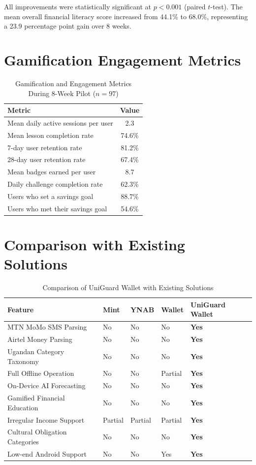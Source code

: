\documentclass[12pt]{report}
\begin{document}
All improvements were statistically significant at $p < 0.001$ (paired $t$-test). The
mean overall financial literacy score increased from 44.1\% to 68.0\%, representing a
23.9 percentage point gain over 8 weeks.

\section{Gamification Engagement Metrics}

\begin{table}[H]
\centering
\caption{Gamification and Engagement Metrics During 8-Week Pilot ($n = 97$)}
\label{tab:engagement}
\begin{tabular}{lc}
\toprule
\textbf{Metric} & \textbf{Value} \\
\midrule
Mean daily active sessions per user & 2.3 \\
Mean lesson completion rate         & 74.6\% \\
7-day user retention rate           & 81.2\% \\
28-day user retention rate          & 67.4\% \\
Mean badges earned per user         & 8.7 \\
Daily challenge completion rate     & 62.3\% \\
Users who set a savings goal        & 88.7\% \\
Users who met their savings goal    & 54.6\% \\
\bottomrule
\end{tabular}
\end{table}

\section{Comparison with Existing Solutions}

\begin{table}[H]
\centering
\caption{Comparison of UniGuard Wallet with Existing Solutions}
\label{tab:comparison}
\begin{tabular}{p{4cm} p{1.5cm} p{1.5cm} p{1.5cm} p{2.5cm}}
\toprule
\textbf{Feature} & \textbf{Mint} & \textbf{YNAB} & \textbf{Wallet} & \textbf{UniGuard Wallet} \\
\midrule
MTN MoMo SMS Parsing & No & No & No & \textbf{Yes} \\
Airtel Money Parsing & No & No & No & \textbf{Yes} \\
Ugandan Category Taxonomy & No & No & No & \textbf{Yes} \\
Full Offline Operation & No & No & Partial & \textbf{Yes} \\
On-Device AI Forecasting & No & No & No & \textbf{Yes} \\
Gamified Financial Education & No & No & No & \textbf{Yes} \\
Irregular Income Support & Partial & Partial & Partial & \textbf{Yes} \\
Cultural Obligation Categories & No & No & No & \textbf{Yes} \\
Low-end Android Support & No & No & Yes & \textbf{Yes} \\
\bottomrule
\end{tabular}
\end{table}
\end{document}
